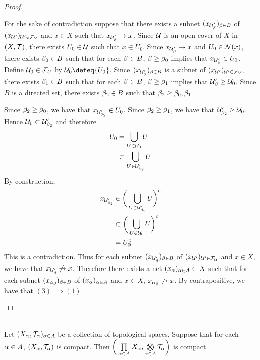 \documentclass{book}
\begin{document}
\begin{proof}
\begin{itemize}
			For the sake of contradiction suppose that there exists a subnet $(x_{\mathcal{U}'_{\beta}})_{\beta \in B}$ of $(x_{\mathcal{U}'})_{\mathcal{U}' \in \mathcal{F}_{\mathcal{U}}}$ and $x \in X$ such that $x_{\mathcal{U}'_{\beta}} \rightarrow x$. Since $\mathcal{U}$ is an open cover of $X$ in $(X, \mathcal{T})$, there exists $U_0 \in \mathcal{U}$ such that $x \in U_0$. Since $x_{\mathcal{U}'_{\beta}} \rightarrow x$ and $U_0 \in \mathcal{N}(x)$, there exists $\beta_0 \in B$ such that for each $\beta \in B$, $\beta \geq \beta_0$ implies that $x_{\mathcal{U}'_{\beta}} \in U_0$. Define $\mathcal{U}_0 \in \mathcal{F}_{U}$ by $\MU_0 \defeq \{U_0\}$. Since $(x_{\mathcal{U}'_{\beta}})_{\beta \in B}$ is a subnet of $(x_{\mathcal{U}'})_{\mathcal{U}' \in \mathcal{F}_{\mathcal{U}}}$, there exists $\beta_1 \in B$ such that for each $\beta \in B$, $\beta \geq \beta_1$ implies that $\mathcal{U}'_{\beta} \geq \mathcal{U}_0$. Since $B$ is a directed set, there exists $\beta_2 \in B$ such that $\beta_2 \geq \beta_0, \beta_1$. 
			
			Since $\beta_2 \geq \beta_0$, we have that $x_{\mathcal{U}'_{\beta_2}} \in U_0$. Since $\beta_2 \geq \beta_1$, we have that $\mathcal{U}'_{\beta_2} \geq \mathcal{U}_0$. Hence $\mathcal{U}_0 \subset \mathcal{U}'_{\beta_2}$ and therefore 
			\begin{align*}
				U_0 
				& = \bigcup\limits_{U \in \mathcal{U}_0} U \\
				& \subset \bigcup\limits_{U \in \mathcal{U}'_{\beta_2}} U
			\end{align*}
			By construction,
			\begin{align*}
				x_{\mathcal{U}'_{\beta_2}} 
				& \in \bigg( \bigcup_{U \in \mathcal{U}'_{\beta_2}} U \bigg)^c \\
				& \subset \bigg( \bigcup_{U \in \mathcal{U}_0} U \bigg)^c \\
				& = U_0^c 
			\end{align*}
			This is a contradiction. Thus for each subnet $(x_{\mathcal{U}'_{\beta}})_{\beta \in B}$ of $(x_{\mathcal{U}'})_{\mathcal{U}' \in \mathcal{F}_{\mathcal{U}}}$ and $x \in X$, we have that $x_{\mathcal{U}'_{\beta}} \not \rightarrow x$. Therefore there exists a net $(x_{\alpha})_{\alpha \in A} \subset X$ such that for each subnet $(x_{\alpha_{\beta}})_{\beta \in B}$ of $(x_{\alpha})_{\alpha \in A}$ and $x \in X$, $x_{\alpha_{\beta}} \not \rightarrow x$. By contrapositive, we have that $(3) \implies (1)$.
		\end{itemize}
	\end{proof}
	
	\begin{ex}   \\ 
		Let $(X_{\alpha}, \mathcal{T}_{\alpha})_{\alpha \in A}$ be a collection of topological spaces. Suppose that for each $\alpha \in A$, $(X_{\alpha} , \mathcal{T}_{\alpha})$ is compact. Then $\bigg( \prod\limits_{\alpha \in A} X_{\alpha}, \bigotimes\limits_{\alpha \in A} \mathcal{T}_{\alpha} \bigg)$ is compact. \\
	\end{ex}
\end{document}
